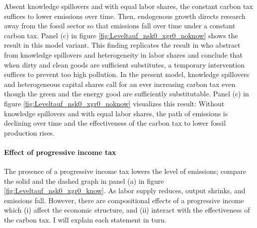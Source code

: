 Absent knowledge spillovers and with equal labor shares, the constant carbon tax suffices to lower emissions over time. Then, endogenous growth directs research away from the fossil sector so that emissions fall over time under a constant carbon tax. Panel (c) in figure \ref{fig:Leveltauf_nsk0_xgr0_noknow} shows the result in this model variant. 
This finding replicates the result in \cite{Acemoglu2012TheChange} who abstract from knowledge spillovers and heterogeneity in labor shares and conclude that when dirty and clean goods are sufficient substitutes, a temporary intervention suffices to prevent too high pollution. In the present model, knowledge spillovers and heterogeneous capital shares 
call for an ever increasing carbon tax even though the green and the energy good are sufficiently substitutable. Panel (c) in figure \ref{fig:Leveltauf_nsk0_xgr0_noknow} visualizes this result: Without knowledge spillovers and with equal labor shares, the path of emissions is declining over time and the effectiveness of the carbon tax to lower fossil production rises. 

\paragraph{Effect of progressive income tax}
 
 The presence of a progressive income tax lowers the level of emissions; compare the solid and the dashed graph in panel (a) in figure \ref{fig:Leveltauf_nsk0_xgr0_know}. As labor supply reduces, output shrinks, and emissions fall. 
 However, there are compositional effects of a progressive income which (i) affect the economic structure, and (ii) interact with the effectiveness of the carbon tax. I will explain each statement in turn. 
 
